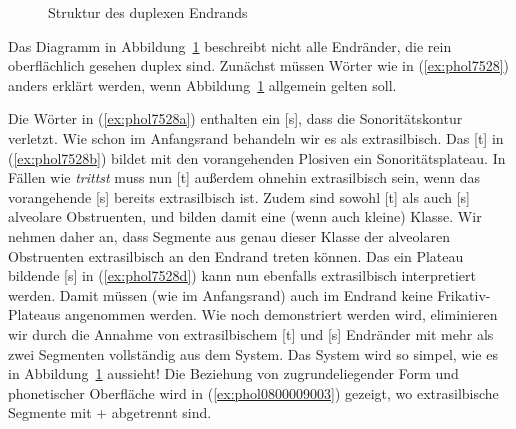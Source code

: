 \begin{figure}[!htbp]
  \caption{Struktur des duplexen Endrands}
  \label{fig:endranduplex}
\end{figure}

Das Diagramm in Abbildung~\ref{fig:endranduplex} beschreibt nicht alle Endränder, die rein oberflächlich gesehen duplex sind.
Zunächst müssen Wörter wie in (\ref{ex:phol7528}) anders erklärt werden, wenn Abbildung~\ref{fig:endranduplex} allgemein gelten soll.

\begin{exe}
  \ex \label{ex:phol7528}
  \begin{xlist}
  \end{xlist}
\end{exe}

Die Wörter in (\ref{ex:phol7528a}) enthalten ein [s], dass die Sonoritätskontur verletzt.
Wie schon im Anfangsrand behandeln wir es als extrasilbisch.
Das [t] in (\ref{ex:phol7528b}) bildet mit den vorangehenden Plosiven ein Sonoritätsplateau.
In Fällen wie \textit{trittst} muss nun [t] außerdem ohnehin extrasilbisch sein, wenn das vorangehende [s] bereits extrasilbisch ist.
Zudem sind sowohl [t] als auch [s] alveolare Obstruenten, und bilden damit eine (wenn auch kleine) Klasse.
Wir nehmen daher an, dass Segmente aus genau dieser Klasse der alveolaren Obstruenten extrasilbisch an den Endrand treten können.
Das ein Plateau bildende [s] in (\ref{ex:phol7528d}) kann nun ebenfalls extrasilbisch interpretiert werden.
Damit müssen (wie im Anfangsrand) auch im Endrand keine Frikativ-Plateaus angenommen werden.
Wie noch demonstriert werden wird, eliminieren wir durch die Annahme von extrasilbischem [t] und [s] Endränder mit mehr als zwei Segmenten vollständig aus dem System.
Das System wird so simpel, wie es in Abbildung~\ref{fig:endranduplex} aussieht!
Die Beziehung von zugrundeliegender Form und phonetischer Oberfläche wird in (\ref{ex:phol0800009003}) gezeigt, wo extrasilbische Segmente mit + abgetrennt sind.


